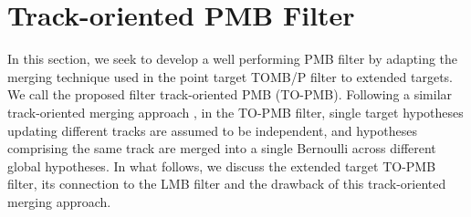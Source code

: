 \documentclass[journal]{IEEEtran}
\begin{document}
\section{Track-oriented PMB Filter}
In this section, we seek to develop a well performing PMB filter by adapting the merging technique used in the point target TOMB/P filter \cite{pmbmpoint} to extended targets. We call the proposed filter track-oriented PMB (TO-PMB). Following a similar track-oriented merging approach \cite{pmbmpoint}, in the TO-PMB filter, single target hypotheses updating different tracks are assumed to be independent, and hypotheses comprising the same track are merged into a single Bernoulli across different global hypotheses. In what follows, we discuss the extended target TO-PMB filter, its connection to the LMB filter and the drawback of this track-oriented merging approach. 



\end{document}
